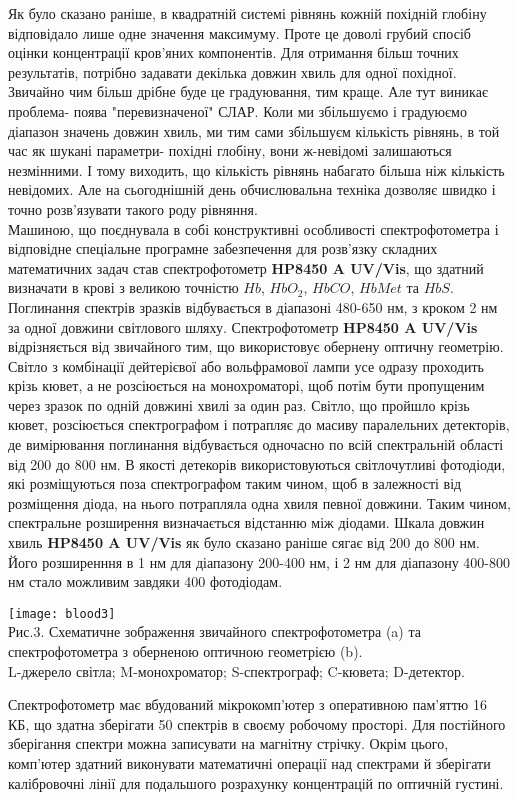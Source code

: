 \documentclass[14pt,a4paper]{scrartcl}
\begin{document}
Як було сказано раніше, в квадратній системі рівнянь кожній похідній глобіну відповідало лише одне значення максимуму. Проте це доволі грубий спосіб оцінки концентрації кров'яних компонентів. Для отримання більш точних результатів, потрібно задавати декілька довжин хвиль для одної похідної. Звичайно чим більш дрібне буде це градуювання, тим краще. Але тут виникає проблема- поява "перевизначеної" СЛАР. Коли ми  збільшуємо і градуюємо діапазон значень довжин хвиль, ми тим сами збільшуєм кількість рівнянь, в той час як шукані параметри- похідні глобіну, вони ж-невідомі залишаються незмінними. І тому виходить, що кількість рівнянь набагато більша ніж кількість невідомих. Але на сьогоднішній день обчислювальна техніка дозволяє швидко і точно розв'язувати такого роду рівняння.\\

Машиною, що поєднувала в собі конструктивні особливості спектрофотометра і відповідне спеціальне програмне забезпечення для розв'язку складних математичних задач став спектрофотометр {\bf HP8450 A UV/Vis}, що здатний визначати в крові з великою точністю $Hb$, $HbO_2$, $HbCO$, $HbMet$ та $HbS$. Поглинання спектрів зразків відбувається в діапазоні 480-650 нм, з кроком 2 нм за одної довжини світлового шляху.
\newpage
Спектрофотометр {\bf HP8450 A UV/Vis} відрізняється від звичайного тим, що використовує обернену оптичну геометрію. Світло з комбінації дейтерієвої або вольфрамової лампи усе одразу проходить крізь кювет, а не розсіюється на монохроматорі, щоб потім бути пропущеним через зразок по одній довжині хвилі за один раз. Світло, що пройшло крізь кювет, розсіюється спектрографом і потрапляє до масиву паралельних детекторів, де вимірювання поглинання відбувається одночасно по всій спектральній області від 200 до 800 нм. В якості детекорів використовуються світлочутливі фотодіоди, які розміщуються поза спектрографом таким чином, щоб в залежності від розміщення діода, на нього потрапляла одна  хвиля певної довжини. Таким чином, спектральне розширення визначається відстанню між діодами. Шкала довжин хвиль {\bf HP8450 A UV/Vis} як було сказано раніше сягає від 200 до 800 нм. Його розширенння в 1 нм для діапазону 200-400 нм, і 2 нм для діапазону 400-800 нм стало можливим завдяки 400 фотодіодам.
\begin{center}
\small
\texttt{[image: blood3]}\\[0.3 cm]
Рис.3. Схематичне зображення звичайного спектрофотометра (a) та спектрофотометра з оберненою оптичною геометрією (b). \cite{l6}\\
L-джерело світла; M-монохроматор; S-спектрограф; C-кювета; D-детектор.
\end{center} 
Спектрофотометр має вбудований мікрокомп'ютер з оперативною пам'яттю 16 КБ, що здатна зберігати 50 спектрів в своєму робочому просторі. Для постійного зберігання спектри можна записувати на магнітну стрічку. Окрім цього, комп'ютер здатний виконувати математичні операції над спектрами й зберігати калібровочні лінії для подальшого розрахунку концентрацій по оптичній густині.\\
\end{document}
